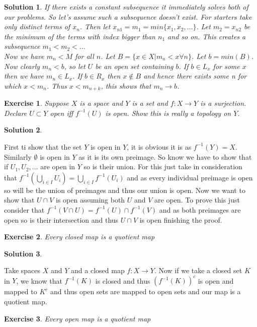 \documentclass[11pt,a4paper]{article}
\newtheorem{Ex}{Exercise}
\newtheorem{Sol}{Solution}
\begin{document}
\begin{Sol}
	\noindent If there exists a constant subsequence it immediately solves both of our problems. So let's assume such a subsequence doesn't exist. For starters take only distinct terms of $x_n$. Then let $x_{n1} =m_1 = min\{x_1,x_2,\dots \}$. Let $m_2 = x_{n2}$ be the minimum of the terms with index bigger than $n_1$ and so on. This creates a subsequence $m_1 < m_2 < \dots$  \\ 
	Now we have $m_n < M$ for all $n$. Let $B = \{ x \in X|m_n < x \forall n \}$. Let $b=min(B)$. Now clearly $m_n < b$, so let $U$ be an open set containing $b$. If $b\in L_x$ for some $x$ then we have $m_n \in L_x$. If $b \in R_x$ then $x\not \in B$ and hence there exists some n for which $x<m_n$. Thus $x<m_{n+k}$, this shows that $m_n \rightarrow b$.
\end{Sol}

\begin{Ex}
	Suppose $X$ is a space and $Y$ is a set and $f : X \rightarrow Y$ is a surjection. Declare $U \subset Y$ open iff $f^{-1}(U)$ is open. Show this is really a topology on $Y$.  
\end{Ex}
\begin{Sol}\end{Sol}
	First ti show that the set $Y$ is open in $Y$, it is obvious it is as $f^{-1}(Y)=X$. Similarly $\emptyset$ is open in $Y$ as it is its own preimage. So know we have to show that if $U_1, U_2, \dots $ are open in $Y$ so is their union. For this just take in consideration that $f^{-1}(\bigcup_{i \in I}U_i) = \bigcup_{i \in I} f^{-1}(U_i)$ and as every individual preimage is open so will be the union of preimages and thus our union is open. Now we want to show that $U \cap V$ is open assuming both $U$ and $V$ are open. To prove this just consider that $f^{-1}(V \cap U) = f^{-1}(U) \cap f^{-1}(V)$ and as both preimages are open so is their intersection and thus $U \cap V$ is open finishing the proof.

\begin{Ex}
	Every closed map is a quotient map
\end{Ex}
\begin{Sol}\end{Sol}
Take spaces $X$ and $Y$ and a closed map $f: X \rightarrow Y$. Now if we take a closed set $K$ in $Y$, we know that $f^{-1}(K)$ is closed and thus $(f^{-1}(K))^c$ is open and mapped to $K^c$ and thus open sets are mapped to open sets and our map is a quotient map. 

\begin{Ex}
	Every open map is a quotient map
\end{Ex}
\end{document}

